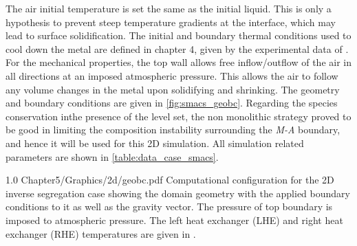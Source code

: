 The air initial temperature is set the same as the initial liquid. This is only a hypothesis to prevent steep temperature gradients at the interface,
which may lead to surface solidification. The initial and boundary thermal conditions used to cool down the metal are defined in chapter 4, given by the experimental
data of \citet{hachani_experimental_2012}. For the mechanical properties, the top wall allows free inflow/outflow of the air in all directions 
at an imposed atmospheric pressure. This allows the air to follow any volume changes in the metal upon solidifying and shrinking. 
The geometry and boundary conditions are given in \cref{fig:smacs_geobc}.
Regarding the species conservation inthe presence of the level set, the non monolithic strategy proved to be good in limiting the 
composition instability surrounding the \emph{M-A} boundary, and hence it will be used for this 2D simulation.
All simulation related parameters are shown in \cref{table:data_case_smacs}.

\begin{figureth}
{1.0}
{Chapter5/Graphics/2d/geobc.pdf}
{Computational configuration for the 2D inverse segregation case showing the domain geometry 
with the applied boundary conditions to it as well as the gravity vector.
The pressure of top boundary is imposed to atmospheric pressure. The left heat exchanger (LHE)
and right heat exchanger (RHE) temperatures are given in \citep{hachani_experimental_2012}.}
\label{fig:smacs_geobc}
\end{figureth}

